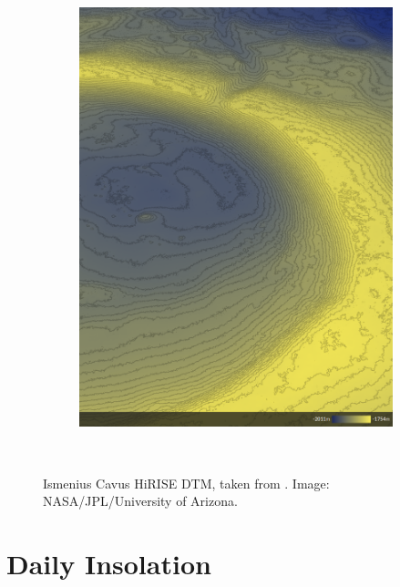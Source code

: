 \begin{figure}[h]
\begin{subfigure}[t]{\subfigureWidth}
        \label{fig:sub:ismenius-cavus-dtm}
    \end{subfigure}\hfill
    \begin{subfigure}[t]{\subfigureWidth}
        \centering
        \includegraphics[height=\graphicsHeight]{sections/mission-sites/images/ismenius-cavus-dtm-altimetry.png}
		\label{fig:sub:ismenius-cavus-dtm-altimetry}
	\end{subfigure}\\[0.8ex]
    \caption[Ismenius Cavus \ac{HiRISE} \ac{DTM}]
            {Ismenius Cavus \ac{HiRISE} \ac{DTM}, taken from . Image: \ac{NASA}/\ac{JPL}/University of Arizona.}
    \label{fig:ismenius-cavus}
\vspace{-2ex}
\end{figure}

\clearpage
\section{Daily Insolation}


